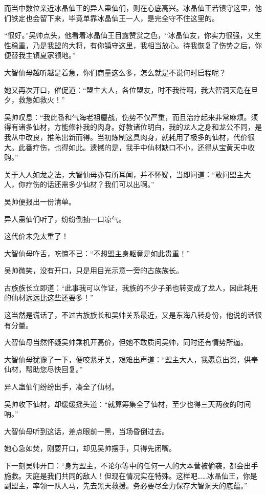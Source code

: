 \begin{this_body}
而当中数位亲近冰晶仙王的异人蛊仙们，则在心底高兴。冰晶仙王若镇守这里，他们铁定也会留下来，毕竟单靠冰晶仙王一人，是完全守不住这里的。

“很好。”吴帅点头，他看着冰晶仙王目露赞赏之色，“冰晶仙友，你实力很强，又生性稳重，乃是我盟的大将，有你镇守这里，我相当放心。待我恢复了伤势之后，你便替我主镇夏家领地。”

大智仙母越听越是着急，你们商量这么多，怎么就是不说何时启程呢？

她又再次开口，催促道：“盟主大人，各位盟友，时不我待啊，我大智洞天危在旦夕，救急如救火！”

吴帅叹息：“我此番和气海老祖鏖战，伤势不仅严重，而且治疗起来非常麻烦。须得有诸多仙材，方能修补我的肉身。好教诸位明白，我的龙人之身和龙公不同，是我从中改良，推陈出新而得。当初炼制这具肉身，就耗用了极多的仙材，代价很大。此番疗伤，也得如此。遗憾的是，我手中仙材缺口不小，还得从宝黄天中收购。”

关于人人如龙之法，大智仙母亦有所耳闻，并不怀疑，当即问道：“敢问盟主大人，你疗伤的话还需多少仙材？我们可以出啊。”

吴帅便报出一份清单。

异人蛊仙们听了，纷纷倒抽一口凉气。

这代价未免太重了！

大智仙母咋舌，吃惊不已：“不想盟主身躯竟是如此贵重！”

吴帅微笑，没有开口，只是用目光示意一旁的古族族长。

古族族长立即道：“此事我可以作证，我族的不少子弟也转变成了龙人，因此耗用的仙材远远比这些还要多！”

这当然是谎话了，不过古族族长和吴帅关系最近，又是东海八转身份，他说的话很有分量。

大智仙母当然怀疑吴帅乘机开高价，但她不敢质问吴帅，同时还有情势所逼。

大智仙母犹豫了一下，便咬紧牙关，艰难出声道：“盟主大人，我愿意出资，供奉仙材，帮助您尽快回复。”

异人蛊仙们纷纷出手，凑全了仙材。

吴帅收下仙材，却缓缓摇头道：“就算筹集全了仙材，至少也得三天两夜的时间呐。”

大智仙母听到这话，差点眼前一黑，当场昏倒过去。

她心急如焚，刚要开口，却见吴帅摆手，只得先闭嘴。

下一刻吴帅开口：“身为盟主，不论尔等中的任何一人的大本营被偷袭，都会出手施救。天庭是我们共同的敌人！但现在情况实在特殊。这样吧……冰晶仙王，你是副盟主，率领一队人马，先去黑天救援。务必要尽全力保存大智洞天的底蕴。”


\end{this_body}
